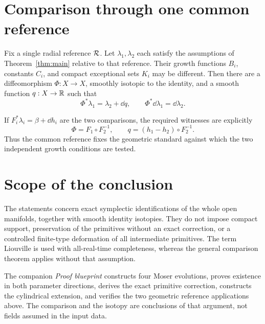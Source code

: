 \clearpage
\section{Comparison through one common reference}
\begin{corollary}\label{cor:common}
Fix a single radial reference $\mathcal R$.
Let $\lambda_1,\lambda_2$ each satisfy the assumptions of
Theorem~\ref{thm:main} relative to that reference.
Their growth functions $B_i$, constants $C_i$, and compact
exceptional sets $K_i$ may be different.
Then there are a diffeomorphism $\Phi:X\to X$, smoothly isotopic
to the identity, and a smooth function $q:X\to\mathbb R$ such that
\[
 \Phi^*\lambda_1=\lambda_2+\dd q,\qquad
 \Phi^*\dd\lambda_1=\dd\lambda_2.
\]
\end{corollary}
If $F_i^*\lambda_i=\beta+\dd h_i$ are the two comparisons, the
required witnesses are explicitly
\[
 \Phi=F_1\circ F_2^{-1},\qquad
 q=(h_1-h_2)\circ F_2^{-1}.
\]
Thus the common reference fixes the geometric standard against
which the two independent growth conditions are tested.

\section{Scope of the conclusion}
The statements concern exact symplectic identifications of the
whole open manifolds, together with smooth identity isotopies.
They do not impose compact support, preservation of the primitives
without an exact correction, or a controlled finite-type
deformation of all intermediate primitives.
The term Liouville is used with all-real-time completeness, whereas
the general comparison theorem applies without that assumption.

The companion \emph{Proof blueprint} constructs four Moser evolutions,
proves existence in both parameter directions, derives the exact
primitive correction, constructs the cylindrical extension, and verifies
the two geometric reference applications above. The comparison and the isotopy are conclusions
of that argument, not fields assumed in the input data.

